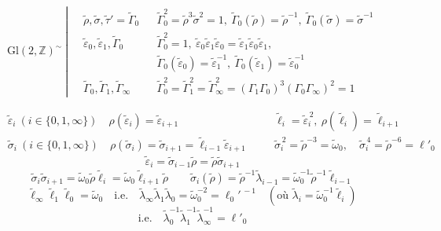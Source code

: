 \documentclass[11pt,a4paper]{article}
\begin{document}
\[
\mathrm{Gl}(2,\mathbb{Z})^{\sim} \ \left|\
\begin{aligned}
&\tilde{\rho}, \tilde{\sigma}, \tilde{\tau}' = \tilde{\Gamma}_0 && \tilde{\Gamma}_0^{2} = \tilde{\rho}^3\tilde{\sigma}^2 = 1, \ \tilde{\Gamma}_0(\tilde{\rho}) = \tilde{\rho}^{-1}, \ \tilde{\Gamma}_0(\tilde{\sigma}) = \tilde{\sigma}^{-1} \\
&\tilde{\varepsilon}_0, \tilde{\varepsilon}_1, \tilde{\Gamma}_0 && \tilde{\Gamma}_0^{2} = 1, \ \tilde{\varepsilon}_0\tilde{\varepsilon}_1\tilde{\varepsilon}_0 = \tilde{\varepsilon}_1\tilde{\varepsilon}_0\tilde{\varepsilon}_1, \\
& && \tilde{\Gamma}_0(\tilde{\varepsilon}_0) = \tilde{\varepsilon}_1^{-1}, \ \tilde{\Gamma}_0(\tilde{\varepsilon}_1) = \tilde{\varepsilon}_0^{-1} \\
&\tilde{\Gamma}_0, \tilde{\Gamma}_1, \tilde{\Gamma}_\infty && \tilde{\Gamma}_0^2 = \tilde{\Gamma}_1^2 = \tilde{\Gamma}_\infty^2 = (\Gamma_1\Gamma_0)^3(\Gamma_0\Gamma_\infty)^{2} = 1
\end{aligned}
\right.
\]

\[
\begin{aligned}
&\tilde{\varepsilon}_i \ (i \in \{0,1,\infty\}) \quad \rho(\tilde{\varepsilon}_i) = \tilde{\varepsilon}_{i+1} &\quad& \tilde{\ell}_i = \tilde{\varepsilon}_i^{\,2}, \ \rho(\tilde{\ell}_i) = \tilde{\ell}_{i+1} \\
&\tilde{\sigma}_i \ (i \in \{0,1,\infty\}) \quad \rho(\tilde{\sigma}_i) = \tilde{\sigma}_{i+1} = \tilde{\ell}_{i-1}\tilde{\varepsilon}_{i+1} && \tilde{\sigma}_i^{\,2} = \tilde{\rho}^{-3} = \tilde{\omega}_0, \quad \tilde{\sigma}_i^{\,4} = \tilde{\rho}^{-6} = \ell'_0
\end{aligned}
\]
\[
\tilde{\varepsilon}_i = \tilde{\sigma}_{i-1}\tilde{\rho} = \tilde{\rho}\tilde{\sigma}_{i+1}
\]
\[
\tilde{\sigma}_i\tilde{\sigma}_{i+1} = \tilde{\omega}_0\tilde{\rho}\tilde{\ell}_i = \tilde{\omega}_0\tilde{\ell}_{i+1}\tilde{\rho}
\qquad
\tilde{\sigma}_i(\tilde{\rho}) = \tilde{\rho}^{-1}\tilde{\lambda}_{i-1} = \tilde{\omega}_0^{-1}\tilde{\rho}^{-1}\tilde{\ell}_{i-1}
\]
\[
\tilde{\ell}_\infty\tilde{\ell}_1\tilde{\ell}_0 = \tilde{\omega}_0 \quad \text{i.e.} \quad
\tilde{\lambda}_\infty\tilde{\lambda}_1\tilde{\lambda}_0 = \tilde{\omega}_0^{-2} = \ell_0'^{\,-1}
\quad (\text{où } \tilde{\lambda}_i = \tilde{\omega}_0^{-1}\tilde{\ell}_i)
\]
\[
\text{i.e.} \quad \tilde{\lambda}_0^{-1}\tilde{\lambda}_1^{-1}\tilde{\lambda}_\infty^{-1} = \ell'_0
\]
\end{document}
